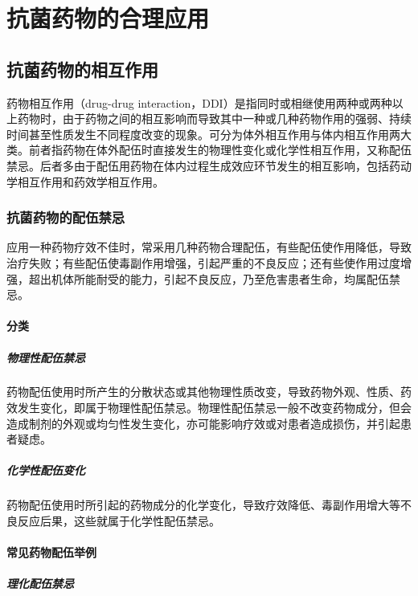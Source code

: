 \chapter{抗菌药物的合理应用}

\section{抗菌药物的相互作用}

药物相互作用（drug-drug
interaction，DDI）是指同时或相继使用两种或两种以上药物时，由于药物之间的相互影响而导致其中一种或几种药物作用的强弱、持续时间甚至性质发生不同程度改变的现象。可分为体外相互作用与体内相互作用两大类。前者指药物在体外配伍时直接发生的物理性变化或化学性相互作用，又称配伍禁忌。后者多由于配伍用药物在体内过程生成效应环节发生的相互影响，包括药动学相互作用和药效学相互作用。

\subsection{抗菌药物的配伍禁忌}

应用一种药物疗效不佳时，常采用几种药物合理配伍，有些配伍使作用降低，导致治疗失败；有些配伍使毒副作用增强，引起严重的不良反应；还有些使作用过度增强，超出机体所能耐受的能力，引起不良反应，乃至危害患者生命，均属配伍禁忌。

\subsubsection{分类}
\paragraph{物理性配伍禁忌}

药物配伍使用时所产生的分散状态或其他物理性质改变，导致药物外观、性质、药效发生变化，即属于物理性配伍禁忌。物理性配伍禁忌一般不改变药物成分，但会造成制剂的外观或均匀性发生变化，亦可能影响疗效或对患者造成损伤，并引起患者疑虑。
\paragraph{化学性配伍变化}

药物配伍使用时所引起的药物成分的化学变化，导致疗效降低、毒副作用增大等不良反应后果，这些就属于化学性配伍禁忌。

\subsubsection{常见药物配伍举例}
\paragraph{理化配伍禁忌}

